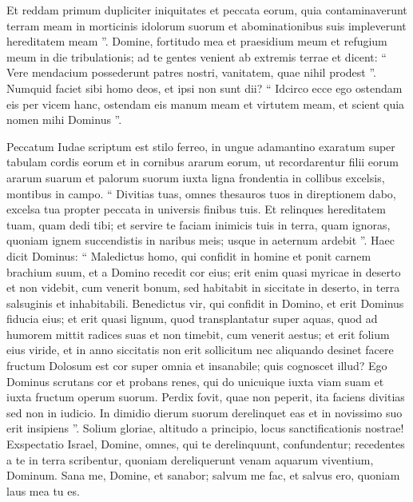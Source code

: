 \begin{biblechapter}
\begin{biblechapter}
\begin{biblechapter}
\begin{biblechapter}
\begin{biblechapter}
\begin{biblechapter}
\begin{biblechapter}
\begin{biblechapter}
\begin{biblechapter}
\begin{biblechapter}
\begin{biblechapter}
\begin{biblechapter}
\begin{biblechapter}
\begin{biblechapter}
\begin{biblechapter}
\begin{biblechapter}
\verse Et reddam primum dupliciter iniquitates et peccata eorum, quia contaminaverunt terram meam in morticinis idolorum suorum et abominationibus suis impleverunt hereditatem meam ”.
 \verse Domine, fortitudo mea et praesidium meum
 et refugium meum in die tribulationis;
 ad te gentes venient ab extremis terrae et dicent:
 “ Vere mendacium possederunt patres nostri,
 vanitatem, quae nihil prodest ”.
 \verse Numquid faciet sibi homo deos,
 et ipsi non sunt dii?
 \verse “ Idcirco ecce ego ostendam eis per vicem hanc,
 ostendam eis manum meam et virtutem meam,
 et scient quia nomen mihi Dominus ”.
 
\begin{biblechapter}
\verse Peccatum Iudae scriptum est stilo ferreo,
 in ungue adamantino exaratum
 super tabulam cordis eorum
 et in cornibus ararum eorum,
 \verse ut recordarentur filii eorum ararum suarum
 et palorum suorum iuxta ligna frondentia
 in collibus excelsis,
 \verse montibus in campo.
 “ Divitias tuas, omnes thesauros tuos
 in direptionem dabo,
 excelsa tua propter peccata
 in universis finibus tuis.
 \verse Et relinques hereditatem tuam,
 quam dedi tibi;
 et servire te faciam inimicis tuis
 in terra, quam ignoras,
 quoniam ignem succendistis in naribus meis;
 usque in aeternum ardebit ”.
 \verse Haec dicit Dominus:
 “ Maledictus homo, qui confidit in homine
 et ponit carnem brachium suum,
 et a Domino recedit cor eius;
 \verse erit enim quasi myricae in deserto
 et non videbit, cum venerit bonum,
 sed habitabit in siccitate in deserto,
 in terra salsuginis et inhabitabili.
 \verse Benedictus vir, qui confidit in Domino,
 et erit Dominus fiducia eius;
 \verse et erit quasi lignum,
 quod transplantatur super aquas,
 quod ad humorem mittit radices suas
 et non timebit, cum venerit aestus;
 et erit folium eius viride,
 et in anno siccitatis non erit sollicitum
 nec aliquando desinet facere fructum
 \verse Dolosum est cor super omnia et insanabile;
 quis cognoscet illud?
 \verse Ego Dominus scrutans cor et probans renes,
 qui do unicuique iuxta viam suam
 et iuxta fructum operum suorum.
 \verse Perdix fovit, quae non peperit,
 ita faciens divitias sed non in iudicio.
 In dimidio dierum suorum derelinquet eas
 et in novissimo suo erit insipiens ”.
 \verse Solium gloriae, altitudo a principio,
 locus sanctificationis nostrae!
 \verse Exspectatio Israel, Domine,
 omnes, qui te derelinquunt, confundentur;
 recedentes a te in terra scribentur,
 quoniam dereliquerunt venam
 aquarum viventium, Dominum.
 \verse Sana me, Domine, et sanabor;
 salvum me fac, et salvus ero,
 quoniam laus mea tu es.

\end{biblechapter}
\end{biblechapter}
\end{biblechapter}
\end{biblechapter}
\end{biblechapter}
\end{biblechapter}
\end{biblechapter}
\end{biblechapter}
\end{biblechapter}
\end{biblechapter}
\end{biblechapter}
\end{biblechapter}
\end{biblechapter}
\end{biblechapter}
\end{biblechapter}
\end{biblechapter}
\end{biblechapter}
